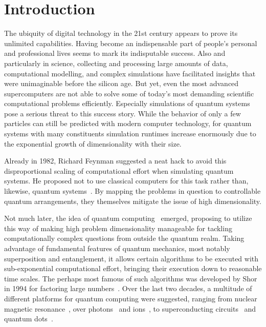\renewcommand{\imagepath}{../10-intro/img}

\chapter{Introduction}
The ubiquity of digital technology in the 21st century appears to prove its unlimited capabilities. Having become an indispensable part of people's personal and professional lives seems to mark its indisputable success. Also and particularly in science, collecting and processing large amounts of data, computational modelling, and complex simulations have facilitated insights that were unimaginable before the silicon age. But yet, even the most advanced supercomputers are not able to solve some of today's most demanding scientific computational problems efficiently. Especially simulations of quantum systems pose a serious threat to this success story. While the behavior of only a few particles can still be predicted with modern computer technology, for quantum systems with many constituents simulation runtimes increase enormously due to the exponential growth of dimensionality with their size.

Already in 1982, Richard Feynman suggested a neat hack to avoid this disproportional scaling of computational effort when simulating quantum systems. He proposed not to use classical computers for this task rather than, likewise, quantum systems~\cite{feynman_simulating_1982}. By mapping the problems in question to controllable quantum arrangements, they themselves mitigate the issue of high dimensionality.

Not much later, the idea of quantum computing~\cite{nielsen_quantum_2010, hidary_quantum_2021, ladd_quantum_2010, mainzer_quantencomputer_2020} emerged, proposing to utilize this way of making high problem dimensionality manageable for tackling computationally complex questions from outside the quantum realm. Taking advantage of fundamental features of quantum mechanics, most notably superposition and entanglement, it allows certain algorithms to be executed with sub-exponential computational effort, bringing their execution down to reasonable time scales. The perhaps most famous of such algorithms was developed by Shor in 1994 for factoring large numbers~\cite{shor_algorithms_1994}. Over the last two decades, a multitude of different platforms for quantum computing were suggested, ranging from nuclear magnetic resonance~\cite{cory_ensemble_1997}, over photons~\cite{duan_scalable_2004,zhong_quantum_2020} and ions~\cite{home_complete_2009}, to superconducting circuits~\cite{dicarlo_demonstration_2009, arute_quantum_2019-1} and quantum dots~\cite{hanson_spins_2007}.


